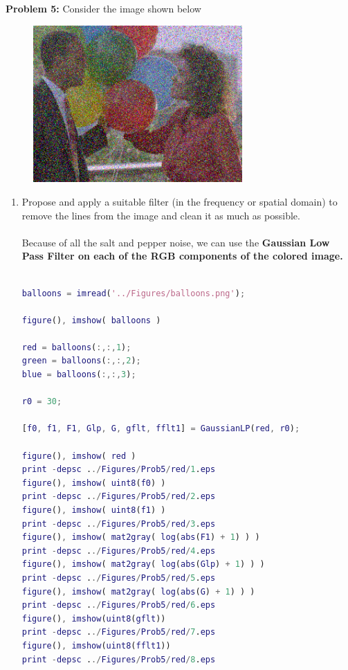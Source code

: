 \documentclass[11pt]{article}
\newenvironment{problem}[1]{\textbf{Problem #1: }}{\newpage}
\begin{document}
	\begin{problem}{5}
		Consider the image shown below
		\begin{figure}[h!]
			\centering
			\includegraphics[height = 6cm]{Figures/Balloons.png}
		\end{figure}
		\begin{enumerate}[label = (\alph*)]
			\item Propose and apply a suitable filter (in the frequency or spatial domain) to remove the lines from the image and clean it as much as possible.
			\\ \\
			Because of all the salt and pepper noise, we can use the \textbf{Gaussian Low Pass Filter on each of the RGB components of the colored image.}
			\\ \\
\begin{lstlisting}[language=Matlab]
balloons = imread('../Figures/balloons.png');

figure(), imshow( balloons )

red = balloons(:,:,1);
green = balloons(:,:,2);
blue = balloons(:,:,3);

r0 = 30;

[f0, f1, F1, Glp, G, gflt, fflt1] = GaussianLP(red, r0);

figure(), imshow( red )
print -depsc ../Figures/Prob5/red/1.eps
figure(), imshow( uint8(f0) )
print -depsc ../Figures/Prob5/red/2.eps
figure(), imshow( uint8(f1) )
print -depsc ../Figures/Prob5/red/3.eps
figure(), imshow( mat2gray( log(abs(F1) + 1) ) )
print -depsc ../Figures/Prob5/red/4.eps
figure(), imshow( mat2gray( log(abs(Glp) + 1) ) )
print -depsc ../Figures/Prob5/red/5.eps
figure(), imshow( mat2gray( log(abs(G) + 1) ) )
print -depsc ../Figures/Prob5/red/6.eps
figure(), imshow(uint8(gflt))
print -depsc ../Figures/Prob5/red/7.eps
figure(), imshow(uint8(fflt1))
print -depsc ../Figures/Prob5/red/8.eps




\end{lstlisting}
\end{enumerate}
\end{problem}
\end{document}
